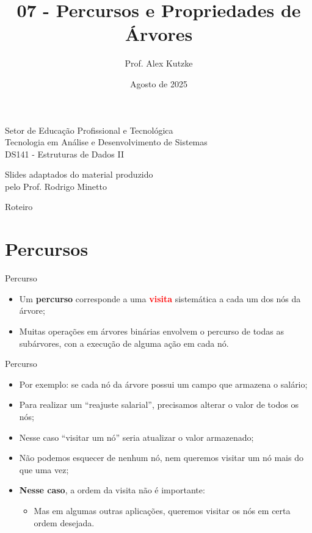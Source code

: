 \documentclass{beamer}
\title{07 - Percursos e Propriedades de Árvores}
\author{Prof. Alex Kutzke}
\date{Agosto de 2025}
\newcommand{\tcr}[1]{\textcolor{red}{\textbf{#1}}}
\begin{document}
\begin{frame}
  \begin{center}
    \large{Setor de Educação Profissional e Tecnológica}\\
    Tecnologia em Análise e Desenvolvimento de Sistemas\\
    \vspace{1cm}			
    \small{DS141 - Estruturas de Dados II}
  \end{center}
  \titlepage

  \begin{center}
    Slides adaptados do material produzido\\pelo Prof. Rodrigo Minetto
  \end{center}
\end{frame}

\begin{frame}[c]{Roteiro}
  \tableofcontents

\end{frame}

\section{Percursos}

\begin{frame}[c]{Percurso}
  \begin{itemize}
    \item Um \textbf{percurso} corresponde a uma \tcr{visita} sistemática a cada um dos
      nós da árvore;
    \item Muitas operações em árvores binárias envolvem o percurso de todas as subárvores,
      con a execução de alguma ação em cada nó.
  \end{itemize}
\end{frame}

\begin{frame}[c]{Percurso}
  \begin{itemize}
    \item Por exemplo: se cada nó da árvore possui um campo que armazena o salário;
    \item Para realizar um ``reajuste salarial'', precisamos alterar o valor de todos os nós;
    \item Nesse caso ``visitar um nó'' seria atualizar o valor armazenado;
    \item Não podemos esquecer de nenhum nó, nem queremos visitar um nó mais do que uma vez;
    \item \textbf{Nesse caso}, a ordem da visita não é importante:
    \begin{itemize}
      \item Mas em algumas outras aplicações, queremos visitar os nós em certa ordem desejada.
    \end{itemize}
  \end{itemize}
\end{frame}
\end{document}
